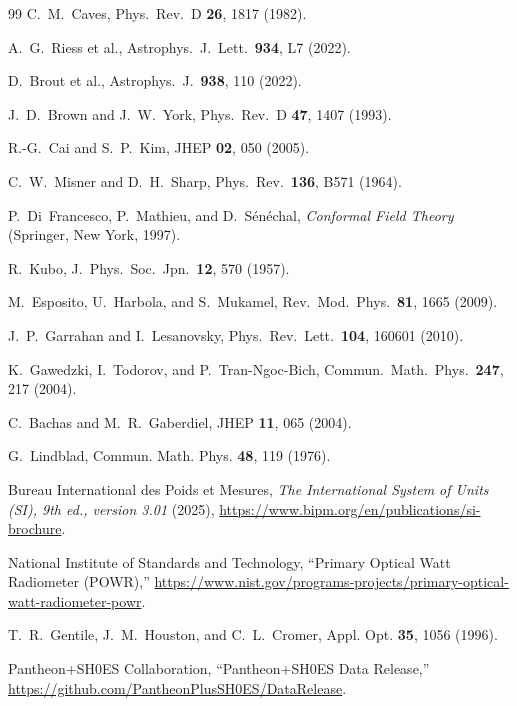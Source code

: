 \documentclass[aps,prd,twocolumn,10pt,superscriptaddress,nofootinbib]{revtex4-2}
\begin{document}
\begin{thebibliography}{99}
C.~M.~Caves,
Phys.\ Rev.\ D \textbf{26}, 1817 (1982).

A.~G.~Riess et al.,
Astrophys.\ J.\ Lett.\ \textbf{934}, L7 (2022).

D.~Brout et al.,
Astrophys.\ J.\ \textbf{938}, 110 (2022).

J.~D.~Brown and J.~W.~York,
Phys.\ Rev.\ D \textbf{47}, 1407 (1993).

R.-G.~Cai and S.~P.~Kim,
JHEP \textbf{02}, 050 (2005).

C.~W.~Misner and D.~H.~Sharp,
Phys.\ Rev.\ \textbf{136}, B571 (1964).

P.~Di~Francesco, P.~Mathieu, and D.~S\'en\'echal,
\emph{Conformal Field Theory} (Springer, New York, 1997).

R.~Kubo,
J.\ Phys.\ Soc.\ Jpn.\ \textbf{12}, 570 (1957).

M.~Esposito, U.~Harbola, and S.~Mukamel,
Rev.\ Mod.\ Phys.\ \textbf{81}, 1665 (2009).

J.~P.~Garrahan and I.~Lesanovsky,
Phys.\ Rev.\ Lett.\ \textbf{104}, 160601 (2010).

K.~Gawedzki, I.~Todorov, and P.~Tran-Ngoc-Bich,
Commun.\ Math.\ Phys.\ \textbf{247}, 217 (2004).

C.~Bachas and M.~R.~Gaberdiel,
JHEP \textbf{11}, 065 (2004).



G.~Lindblad,
Commun. Math. Phys. \textbf{48}, 119 (1976).

Bureau International des Poids et Mesures,
\emph{The International System of Units (SI), 9th ed., version 3.01}
(2025), \url{https://www.bipm.org/en/publications/si-brochure}.

National Institute of Standards and Technology,
``Primary Optical Watt Radiometer (POWR),''
\url{https://www.nist.gov/programs-projects/primary-optical-watt-radiometer-powr}.

T.~R.~Gentile, J.~M.~Houston, and C.~L.~Cromer,
Appl. Opt. \textbf{35}, 1056 (1996).

Pantheon+SH0ES Collaboration,
``Pantheon+SH0ES Data Release,''
\url{https://github.com/PantheonPlusSH0ES/DataRelease}.


\end{thebibliography}
\end{document}
